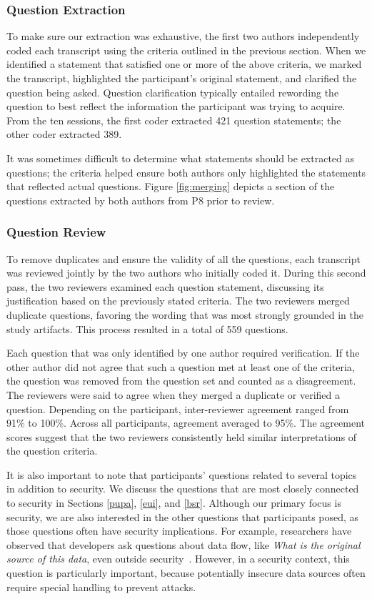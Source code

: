 \documentclass[10pt,journal,compsoc]{IEEEtran}
\begin{document}
\subsubsection{Question Extraction}
To make sure our extraction was exhaustive, the first two authors independently coded each transcript using the criteria outlined in the previous section.
When we identified a statement that satisfied one or more of the above criteria, we marked the transcript, highlighted the participant's original statement, and clarified the question being asked.
Question clarification typically entailed rewording the question to best reflect the information the participant was trying to acquire.
From the ten sessions, the first coder extracted 421 question statements; the other coder extracted 389. 

It was sometimes difficult to determine what statements should be extracted as questions; the criteria helped ensure both authors only highlighted the statements that reflected actual questions. 
Figure \ref{fig:merging} depicts a section of the questions extracted by both authors from P8 prior to review.


\subsubsection{Question Review}
To remove duplicates and ensure the validity of all the questions, each transcript was reviewed jointly by the two authors who initially coded it.
During this second pass, the two reviewers examined each question statement, discussing its justification based on the previously stated criteria.
The two reviewers merged duplicate questions, favoring the wording that was most strongly grounded in the study artifacts.
This process resulted in a total of 559 questions.

Each question that was only identified by one author required verification.
If the other author did not agree that such a question met at least one of the criteria, the question was removed from the question set and counted as a disagreement.
The reviewers were said to agree when they merged a duplicate or verified a question. Depending on the participant, inter-reviewer agreement ranged from 91\% to 100\%. Across all participants, agreement averaged to 95\%.
The agreement scores suggest that the two reviewers consistently held similar interpretations of the question criteria.

It is also important to note that participants' questions related to several topics in addition to security. 
We discuss the questions that are most closely connected to security in Sections \ref{pupa}, \ref{eui}, and \ref{bsr}.
Although our primary focus is security, we are also interested in the other questions that participants posed, as those questions often have security implications.
For example, researchers have observed that developers ask questions about data flow, like \emph{What is the original source of this data}, even outside security~\cite{latoza2010hard}.
However, in a security context, this question is particularly important, because potentially insecure data sources often require special handling to prevent attacks.
\end{document}
